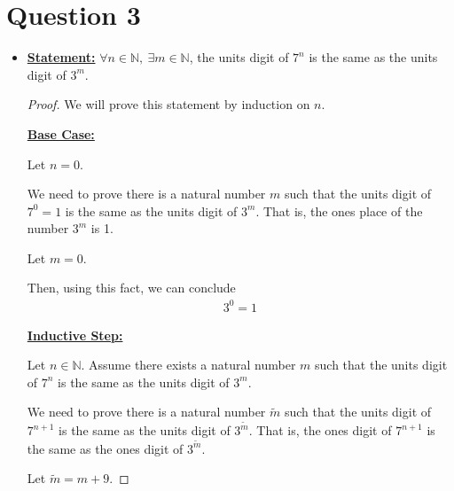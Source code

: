 \documentclass[12pt]{article}
\begin{document}
\section*{Question 3}
\begin{itemize}
    \item

    \underline{\textbf{Statement:}} $\forall n \in \mathbb{N},\:\exists m \in \mathbb{N}$,
    the units digit of $7^n$ is the same as the units digit of $3^m$.

    \bigskip

    \begin{proof}

    We will prove this statement by induction on $n$.

    \bigskip

    \underline{\textbf{Base Case:}}

    \bigskip

    Let $n = 0$.

    \bigskip

    We need to prove there is a natural number $m$ such that the
    units digit of $7^0 = 1$ is the same as the units digit of $3^m$. That is,
    the ones place of the number $3^m$ is 1.

    \bigskip

    Let $m = 0$.

    \bigskip

    Then, using this fact, we can conclude
    \setcounter{equation}{0}
    \begin{align}
        3^0 = 1
    \end{align}

    \bigskip

    \underline{\textbf{Inductive Step:}}

    \bigskip

    Let $n \in \mathbb{N}$. Assume there exists a natural number $m$ such that
    the units digit of $7^n$ is the same as the units digit of $3^m$.

    \bigskip

    We need to prove there is a natural number $\tilde{m}$ such that the
    units digit of $7^{n+1}$ is the same as the units digit of $3^{\tilde{m}}$.
    That is, the ones digit of $7^{n+1}$ is the same as the ones digit of $3^{\tilde{m}}$.

    \bigskip

    Let $\tilde{m} = m + 9$.

    \bigskip


\end{proof}
\end{itemize}
\end{document}

